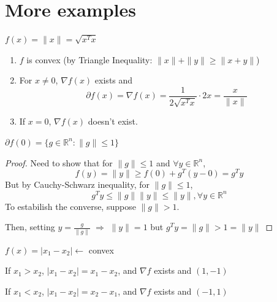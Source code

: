 \documentclass[11pt]{elegantbook}
\begin{document}
\section{More examples}
\begin{example}
    $f(x)=\|x\|=\sqrt{x^Tx}$
\end{example}
\begin{enumerate}[$\bullet$]
    \item $f$ is convex (by Triangle Inequality: $\|x\|+\|y\|\geq \|x+y\|$)
    \item For $x\neq 0$, $\nabla f(x)$ exists and $$\partial f(x)= \nabla f(x) =\frac{1}{2\sqrt{x^Tx}}\cdot 2x=\frac{x}{\|x\|}$$
    \item If $x=0$, $\nabla f(x)$ doesn't exist.
\end{enumerate}

\begin{proposition}
    $\partial f(0)=\{g\in \mathbb{R}^n:\|g\|\leq 1\}$
\end{proposition}
\begin{proof}
    Need to show that for $\|g\|\leq 1$ and $\forall y\in \mathbb{R}^n$, $$f(y)=\|y\|\geq f(0)+g^T(y-0)=g^T y$$
    But by Cauchy-Schwarz inequality, for $\|g\|\leq 1$, $$g^Ty\leq \|g\|\|y\|\leq \|y\|,\forall y\in \mathbb{R}^n$$
    To estabilish the converse, suppose $\|g\|>1$.

    Then, setting $y=\frac{g}{\|g\|}$ $\Rightarrow$ $\|y\|=1$ but $g^Ty=\|g\|>1=\|y\|$
\end{proof}

\begin{example}
    $f(x)=|x_1-x_2|\leftarrow$ convex
\end{example}
If $x_1>x_2$, $|x_1-x_2|=x_1-x_2$, and $\nabla f$ exists and $(1,-1)$

If $x_1<x_2$, $|x_1-x_2|=x_2-x_1$, and $\nabla f$ exists and $(-1,1)$
\end{document}
